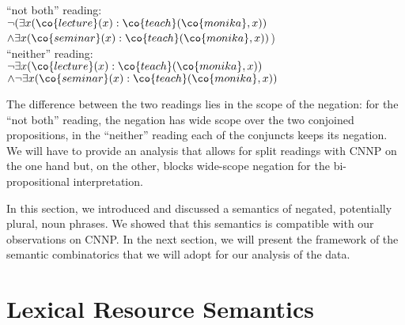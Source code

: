 \documentclass[output=paper]{langsci/langscibook}
\begin{document}
\ea \label{lf-notboth}\label{lf-neither}
\begin{xlist}
\ex 
``not both'' reading:\\ 
\hspace*{-1.5em}
$\lnot (\exists x (\co{lecture}(x) : \co{teach}(\co{monika},x))$\\
\hspace*{1em}$
\land \exists x (\co{seminar}(x) : \co{teach}(\co{monika},x))$)\\
\ex ``neither'' reading:\\ 
\hspace*{-1.5em}
$\lnot \exists x (\co{lecture}(x) : \co{teach}(\co{monika},x))$\\
\hspace*{1em}$
\land \lnot \exists x (\co{seminar}(x) : \co{teach}(\co{monika},x))$
\end{xlist}
\z 

\begin{sloppypar}
  The difference between the two readings lies in the scope of the
  negation: for the ``not both'' reading, the negation has wide scope
  over the two conjoined propositions, in the ``neither'' reading each
  of the conjuncts keeps its negation. We will have to provide an
  analysis that allows for split readings with CNNP on the one hand
  but, on the other, blocks wide-scope negation for the
  bi-propositional interpretation.
\end{sloppypar}

In this section, we introduced and discussed a semantics of negated, potentially plural, noun phrases. We showed that this semantics is  compatible with our observations on  CNNP. 
In the next section, we will present the framework  of the semantic combinatorics that we will adopt for our analysis of the data.

\section{Lexical Resource Semantics}\label{Sec-LRS}\largerpage
\end{document}
